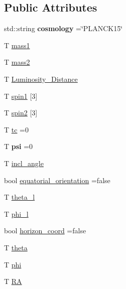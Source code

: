 \subsection*{Public Attributes}
\begin{DoxyCompactItemize}
\item 
\mbox{\label{classgen__params__base_ae26c1d93a26bb3f7f31b77cefa50b43c}} 
std\+::string {\bfseries cosmology} =\char`\"{}P\+L\+A\+N\+C\+K15\char`\"{}
\item 
T \hyperlink{classgen__params__base_a8e7626a0841f4d2224b625e327f7679a}{mass1}
\item 
T \hyperlink{classgen__params__base_a8bb568ea6c20f9442a5fd0f1b01344e0}{mass2}
\item 
T \hyperlink{classgen__params__base_ad1fe02f4ddabb07ba1cf42ec7e31d659}{Luminosity\+\_\+\+Distance}
\item 
T \hyperlink{classgen__params__base_a42e83426b899a1b9c987101433943a02}{spin1} \mbox{[}3\mbox{]}
\item 
T \hyperlink{classgen__params__base_a1e8a89670cf689d2b2afc4e59cd89b58}{spin2} \mbox{[}3\mbox{]}
\item 
T \hyperlink{classgen__params__base_a87694ca69c736862b334f3cb6cc82ae6}{tc} =0
\item 
\mbox{\label{classgen__params__base_af1c02da522106d065ee3ebefe77a11a6}} 
T {\bfseries psi} =0
\item 
T \hyperlink{classgen__params__base_af55fdc0245e65234b570f5c9918bd88b}{incl\+\_\+angle}
\item 
bool \hyperlink{classgen__params__base_a769d637405f8456595b513305f91d0ca}{equatorial\+\_\+orientation} =false
\item 
T \hyperlink{classgen__params__base_a760b7a0a51b9cd24cb63c13344e6493c}{theta\+\_\+l}
\item 
T \hyperlink{classgen__params__base_aaec5fafce24e74b099b713f47d25045f}{phi\+\_\+l}
\item 
bool \hyperlink{classgen__params__base_a75a9201e603d8d7e348a8ae914b03ee9}{horizon\+\_\+coord} =false
\item 
T \hyperlink{classgen__params__base_a078e76b35c7b95ab24790258ffcc2be0}{theta}
\item 
T \hyperlink{classgen__params__base_a500f71cd641e52356d6371894f7d8a07}{phi}
\item 
T \hyperlink{classgen__params__base_abe5fc4017be70773feba6964cb9616e9}{RA}

\end{DoxyCompactItemize}
